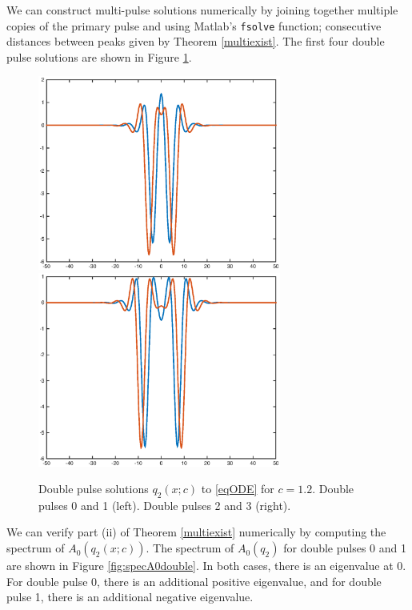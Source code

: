 \documentclass[12pt]{article}
\begin{document}
We can construct multi-pulse solutions numerically by joining together multiple copies of the primary pulse and using Matlab's \texttt{fsolve} function; consecutive distances between peaks given by Theorem \ref{multiexist}. The first four double pulse solutions are shown in Figure \ref{fig:double}.

\begin{figure}[H]
\centering
\includegraphics[width=8cm]{double12_12.eps}
\includegraphics[width=8cm]{double12_34.eps}
\caption{Double pulse solutions $q_2(x; c)$ to \eqref{eqODE} for $c = 1.2$. Double pulses 0 and 1 (left). Double pulses 2 and 3 (right).}
\label{fig:double}
\end{figure}

We can verify part (ii) of Theorem \ref{multiexist} numerically by computing the spectrum of $A_0(q_2(x; c))$. The spectrum of $A_0(q_2)$ for double pulses 0 and 1 are shown in Figure \ref{fig:specA0double}. In both cases, there is an eigenvalue at 0. For double pulse 0, there is an additional positive eigenvalue, and for double pulse 1, there is an additional negative eigenvalue.
\end{document}
